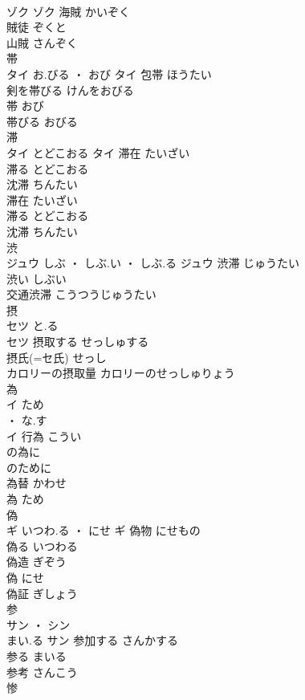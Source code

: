 \documentclass[8pt]{extreport}
\begin{document}
\begin{CJK}{UTF8}{min}
\\	ゾク		ゾク	海賊	かいぞく	
\\	賊徒	ぞくと	
\\	山賊	さんぞく	
\\	帯	
\\	タイ	お.びる ・ おび	タイ	包帯	ほうたい	
\\	剣を帯びる	けんをおびる	
\\	帯	おび	
\\	帯びる	おびる	
\\	滞	
\\	タイ	とどこおる	タイ	滞在	たいざい	
\\	滞る	とどこおる	
\\	沈滞	ちんたい	
\\	滞在	たいざい	
\\	滞る	とどこおる	
\\	沈滞	ちんたい	
\\	渋	
\\	ジュウ	しぶ ・ しぶ.い ・ しぶ.る	ジュウ	渋滞	じゅうたい	
\\	渋い	しぶい	
\\	交通渋滞	こうつうじゅうたい	
\\	摂	
\\	セツ	と.る
\\	セツ	摂取する	せっしゅする	
\\	摂氏(=セ氏)	せっし	
\\	カロリーの摂取量	カロリーのせっしゅりょう	
\\	為	
\\	イ	ため
\\	・ な.す
\\	イ	行為	こうい	
\\	の為に	
\\	のために	
\\	為替	かわせ	
\\	為	ため	
\\	偽	
\\	ギ	いつわ.る ・ にせ	ギ	偽物	にせもの	
\\	偽る	いつわる	
\\	偽造	ぎぞう	
\\	偽	にせ	
\\	偽証	ぎしょう	
\\	参	
\\	サン ・ シン
\\	まい.る	サン	参加する	さんかする	
\\	参る	まいる	
\\	参考	さんこう	
\\	惨	

\end{CJK}
\end{document}
